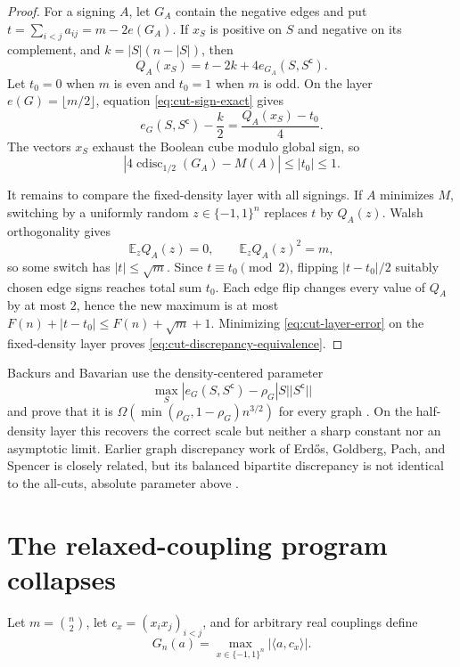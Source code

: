 \documentclass[11pt]{article}
\newcommand{\eps}{\{-1,1\}}
\newcommand{\E}{\mathbb E}
\begin{document}
\begin{proof}
For a signing $A$, let $G_A$ contain the negative edges and put
$t=\sum_{i<j}a_{ij}=m-2e(G_A)$.  If $x_S$ is positive on $S$ and negative
on its complement, and $k=|S|(n-|S|)$, then
\begin{equation}
 Q_A(x_S)=t-2k+4e_{G_A}(S,S^{\mathsf c}).
 \label{eq:cut-sign-exact}
\end{equation}
Let $t_0=0$ when $m$ is even and $t_0=1$ when $m$ is odd.  On the layer
$e(G)=\lfloor m/2\rfloor$, equation \eqref{eq:cut-sign-exact} gives
\[
 e_G(S,S^{\mathsf c})-\frac k2=\frac{Q_A(x_S)-t_0}{4}.
\]
The vectors $x_S$ exhaust the Boolean cube modulo global sign, so
\begin{equation}
 \left|4\operatorname{cdisc}_{1/2}(G_A)-M(A)\right|\le |t_0|\le1.
 \label{eq:cut-layer-error}
\end{equation}

It remains to compare the fixed-density layer with all signings.  If $A$
minimizes $M$, switching by a uniformly random $z\in\eps^n$ replaces $t$
by $Q_A(z)$.  Walsh orthogonality gives
\[
 \E_zQ_A(z)=0,\qquad \E_zQ_A(z)^2=m,
\]
so some switch has $|t|\le\sqrt m$.  Since $t\equiv t_0\pmod2$, flipping
$|t-t_0|/2$ suitably chosen edge signs reaches total sum $t_0$.  Each edge
flip changes every value of $Q_A$ by at most $2$, hence the new maximum is at
most $F(n)+|t-t_0|\le F(n)+\sqrt m+1$.  Minimizing
\eqref{eq:cut-layer-error} on the fixed-density layer proves
\eqref{eq:cut-discrepancy-equivalence}.
\end{proof}

Backurs and Bavarian use the density-centered parameter
\[
 \max_S|e_G(S,S^{\mathsf c})-\rho_G|S||S^{\mathsf c}||
\]
and prove that it is
$\Omega(\min(\rho_G,1-\rho_G)n^{3/2})$ for every graph
\cite{backurs-bavarian}.  On the half-density layer this recovers the correct
scale but neither a sharp constant nor an asymptotic limit.  Earlier graph
discrepancy work of Erd\H{o}s, Goldberg, Pach, and Spencer is closely related,
but its balanced bipartite discrepancy is not identical to the all-cuts,
absolute parameter above \cite{egps}.

\section{The relaxed-coupling program collapses}

Let \(m=\binom n2\), let \(c_x=(x_ix_j)_{i<j}\), and for arbitrary real
couplings define
\[
 G_n(a)=\max_{x\in\eps^n}|\langle a,c_x\rangle|.
\]
\end{document}
